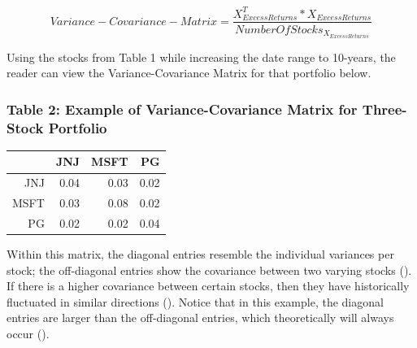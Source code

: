 \documentclass[12pt,english]{article}
\begin{document}
\begin{doublespace}
                \begin{center}
                    \begin{equation} \label{Variance-Covariance-Matrix}
                        Variance-Covariance-Matrix = 
                        \frac{X^{T}_{Excess Returns} * X_{Excess Returns}}
                        {Number Of Stocks_{X_{Excess Returns}}} 
                    \end{equation}
               \end{center}
            
            \indent{}\indent{}
        	Using the stocks from Table 1 while increasing the date range to 10-years, the reader can view the Variance-Covariance Matrix for that portfolio below. 
            
                
                \subsubsection{Table 2: Example of Variance-Covariance Matrix for Three-Stock Portfolio} 
                        \begin{table}[H]
                        \centering
                        \begin{tabular}{rrrr}
                          \hline
                         & JNJ & MSFT & PG \\ 
                          \hline
                        JNJ & 0.04 & 0.03 & 0.02 \\ 
                          MSFT & 0.03 & 0.08 & 0.02 \\ 
                          PG & 0.02 & 0.02 & 0.04 \\ 
                           \hline
                        \end{tabular}
                        \end{table}
                    
                \indent{}
            	Within this matrix, the diagonal entries resemble the individual variances per stock; the off-diagonal entries show the covariance between two varying stocks (\citet{Simon2008}). If there is a higher covariance between certain stocks, then they have historically fluctuated in similar directions (\citet{Simon2008}). Notice that in this example, the diagonal entries are larger than the off-diagonal entries, which theoretically will always occur (\citet{Simon2008}). 


\end{doublespace}
\end{document}
